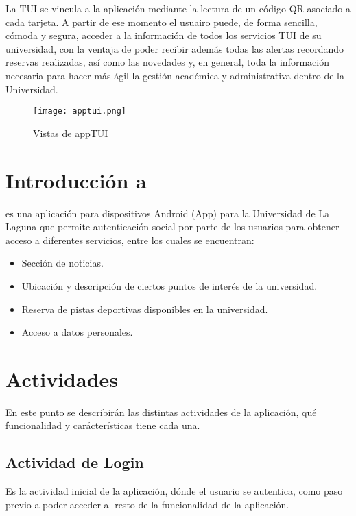 La TUI se vincula a la aplicación mediante la lectura de un código QR asociado a cada tarjeta. 
A partir de ese momento el usuairo puede, de forma sencilla, cómoda y segura, acceder a la 
información de todos los servicios TUI de su universidad, con la ventaja de poder recibir además
todas las alertas recordando reservas realizadas, así como las novedades y, en general, toda 
la información necesaria para hacer más ágil la gestión académica y administrativa dentro de la Universidad.

\begin{figure}[h]
	\centering
	\texttt{[image: apptui.png]}
	\caption{Vistas de appTUI}
	\label{fig:ejemplo}
\end{figure}


\section{Introducción a \App{}}

\App{} es una aplicación para dispositivos Android (App) para la Universidad de La Laguna 
que permite autenticación social por parte de los usuarios para obtener acceso a diferentes servicios, 
entre los cuales se encuentran:

\begin{itemize}
\item Sección de noticias.
\item Ubicación y descripción de ciertos puntos de interés de la universidad.
\item Reserva de pistas deportivas disponibles en la universidad.
\item Acceso a datos personales.
\end{itemize}



\section{Actividades}

En este punto se describirán las distintas actividades de la aplicación, qué funcionalidad 
y carácterísticas tiene cada una. 

\subsection{Actividad de Login}

Es la actividad inicial de la aplicación, dónde el usuario se autentica, como paso previo 
a poder acceder al resto de la funcionalidad de la aplicación. 
\newline

